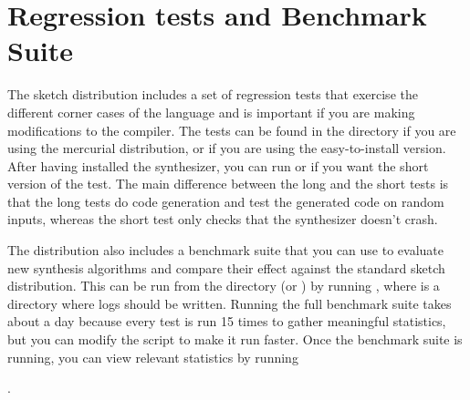 \section{Regression tests and Benchmark Suite}

The sketch distribution includes a set of regression tests that exercise the different corner cases of the language and is important if you are making modifications to the compiler. The tests can be found in the directory  if you are using the mercurial distribution, or  if you are using the easy-to-install version. After having installed the synthesizer, you can run  or  if you want the short version of the test. The main difference between the long and the short tests is that the long tests do code generation and test the generated code on random inputs, whereas the short test only checks that the synthesizer doesn't crash.

The distribution also includes a benchmark suite that you can use to evaluate new synthesis algorithms and compare their effect against the standard sketch distribution. This can be run from the  directory (or ) by running , where  is a directory where logs should be written. Running the full benchmark suite takes about a day because every test is run 15 times to gather meaningful statistics, but you can modify the script to make it run faster. Once the benchmark suite is running, you can view relevant statistics by running 

.
